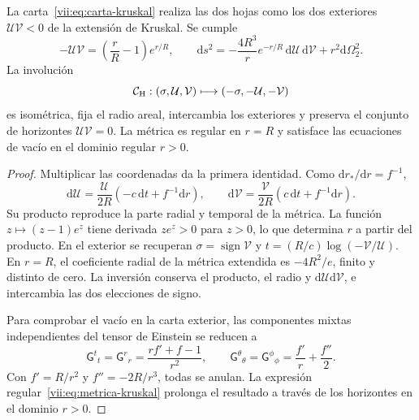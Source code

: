 \begin{theorem}
\label{vii:thm:kruskal-hojas}
La carta~\eqref{vii:eq:carta-kruskal} realiza las dos hojas como los
dos exteriores \(\mathcal U\mathcal V<0\) de la extensión de
Kruskal. Se cumple
\begin{equation}
 -\mathcal U\mathcal V=\left(\frac rR-1\right)e^{r/R},\qquad
 \mathrm ds^2=-\frac{4R^3}{r}e^{-r/R}\,
                    \mathrm d\mathcal U\,\mathrm d\mathcal V
                    +r^2\mathrm d\Omega_2^2.
 \label{vii:eq:metrica-kruskal}
\end{equation}
La involución
\begin{equation}
 \mathcal C_{\rm H}:(\sigma,\mathcal U,\mathcal V)
 \longmapsto(-\sigma,-\mathcal U,-\mathcal V)
 \label{vii:eq:involucion-horizonte}
\end{equation}
es isométrica, fija el radio areal, intercambia los exteriores y preserva
el conjunto de horizontes \(\mathcal U\mathcal V=0\).
La métrica es regular en \(r=R\) y satisface las ecuaciones de vacío
en el dominio regular \(r>0\).
\end{theorem}
\begin{proof}
Multiplicar las coordenadas da la primera identidad. Como
\(\mathrm dr_*/\mathrm dr=f^{-1}\),
\[
 \mathrm d\mathcal U=\frac{\mathcal U}{2R}
            (-c\,\mathrm dt+f^{-1}\mathrm dr),\qquad
 \mathrm d\mathcal V=\frac{\mathcal V}{2R}
            ( c\,\mathrm dt+f^{-1}\mathrm dr).
\]
Su producto reproduce la parte radial y temporal de la métrica.
La función \(z\mapsto(z-1)e^z\) tiene derivada \(ze^z>0\)
para \(z>0\), lo que determina \(r\) a partir del producto.
En el exterior se recuperan
\(\sigma=\operatorname{sign}\mathcal V\) y
\(t=(R/c)\log(-\mathcal V/\mathcal U)\).
En \(r=R\), el coeficiente radial de la métrica extendida es
\(-4R^2/e\), finito y distinto de cero. La inversión conserva el
producto, el radio y \(\mathrm d\mathcal U\mathrm d\mathcal V\),
e intercambia las dos elecciones de signo.

Para comprobar el vacío en la carta exterior, las componentes mixtas
independientes del tensor de Einstein se reducen a
\[
 \mathsf G^t{}_t=\mathsf G^r{}_r
 =\frac{rf'+f-1}{r^2},\qquad
 \mathsf G^\theta{}_\theta=\mathsf G^\phi{}_\phi
 =\frac{f'}r+\frac{f''}2.
\]
Con \(f'=R/r^2\) y \(f''=-2R/r^3\), todas se anulan.
La expresión regular~\eqref{vii:eq:metrica-kruskal} prolonga el
resultado a través de los horizontes en el dominio \(r>0\).
\end{proof}

